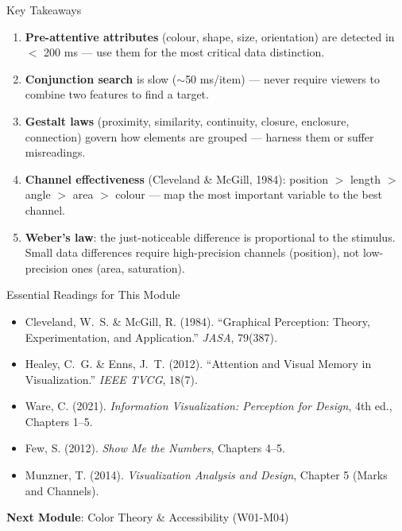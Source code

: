 \documentclass[10pt]{beamer}
\begin{document}
\begin{frame}{Key Takeaways}
  \begin{enumerate}
    \item \textbf{Pre-attentive attributes} (colour, shape, size,
          orientation) are detected in $<$ 200 ms --- use them for the
          most critical data distinction.
    \item \textbf{Conjunction search} is slow ($\sim$50 ms/item) ---
          never require viewers to combine two features to find a target.
    \item \textbf{Gestalt laws} (proximity, similarity, continuity,
          closure, enclosure, connection) govern how elements are grouped
          --- harness them or suffer misreadings.
    \item \textbf{Channel effectiveness} (Cleveland \& McGill, 1984):
          position $>$ length $>$ angle $>$ area $>$ colour --- map the
          most important variable to the best channel.
    \item \textbf{Weber's law}: the just-noticeable difference is
          proportional to the stimulus. Small data differences require
          high-precision channels (position), not low-precision ones
          (area, saturation).
  \end{enumerate}
\end{frame}

\begin{frame}{Essential Readings for This Module}
  \begin{itemize}
    \item Cleveland, W.~S. \& McGill, R. (1984). ``Graphical Perception:
          Theory, Experimentation, and Application.'' \emph{JASA}, 79(387).
    \item Healey, C.~G. \& Enns, J.~T. (2012). ``Attention and Visual
          Memory in Visualization.'' \emph{IEEE TVCG}, 18(7).
    \item Ware, C. (2021). \emph{Information Visualization: Perception
          for Design}, 4th ed., Chapters 1--5.
    \item Few, S. (2012). \emph{Show Me the Numbers}, Chapters 4--5.
    \item Munzner, T. (2014). \emph{Visualization Analysis and Design},
          Chapter 5 (Marks and Channels).
  \end{itemize}

  \vspace{6pt}
  \textbf{Next Module}: Color Theory \& Accessibility (W01-M04)
\end{frame}
\end{document}
